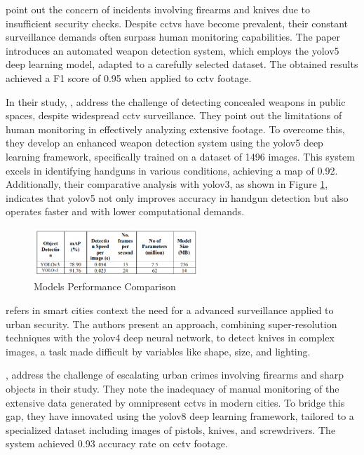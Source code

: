 \citet{rfc3} point out the concern of incidents involving firearms and knives due to insufficient security checks. Despite \ac{cctv}s have become prevalent, their constant surveillance demands often surpass human monitoring capabilities. The paper introduces an automated weapon detection system, which employs the \ac{yolo}v5 deep learning model, adapted to a carefully selected dataset. The obtained results achieved a F1 score of 0.95 when applied to \ac{cctv} footage.

In their study, \citet{rfc5}, address the challenge of detecting concealed weapons in public spaces, despite widespread \ac{cctv} surveillance. They point out the limitations of human monitoring in effectively analyzing extensive footage. To overcome this, they develop an enhanced weapon detection system using the \ac{yolo}v5 deep learning framework, specifically trained on a dataset of 1496 images. This system excels in identifying handguns in various conditions, achieving a \ac{map} of 0.92. Additionally, their comparative analysis with \ac{yolo}v3, as shown in Figure \ref{fig:performance-Thangaraj}, indicates that \ac{yolo}v5 not only improves accuracy in handgun detection but also operates faster and with lower computational demands.

\begin{figure}[h]
    \centering 
    \includegraphics[width=0.55\textwidth]{figs/performance-Thangaraj.png} 
    \caption{Models Performance Comparison \cite{rfc5}}
    \label{fig:performance-Thangaraj}
\end{figure}

\citet{rfc18} refers in smart cities context the need for a advanced surveillance applied to urban security. The authors present an approach, combining super-resolution techniques with the \ac{yolo}v4 deep neural network, to detect knives in complex images, a task made difficult by variables like shape, size, and lighting.

\citet{rfc17}, address the challenge of escalating urban crimes involving firearms and sharp objects in their study. They note the inadequacy of manual monitoring of the extensive data generated by omnipresent \ac{cctv}s in modern cities. To bridge this gap, they have innovated using the \ac{yolo}v8 deep learning framework, tailored to a specialized dataset including images of pistols, knives, and screwdrivers. The system achieved 0.93 accuracy rate on \ac{cctv} footage.

